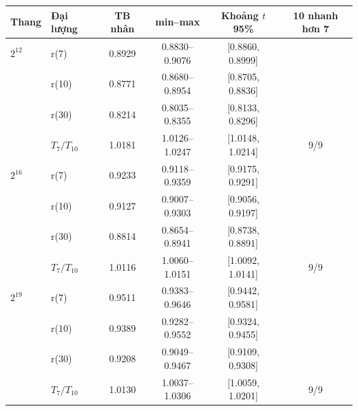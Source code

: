\begin{tabular}{llcccc}
\toprule
Thang & Đại lượng & TB nhân & min--max & Khoảng $t$ 95\% & 10 nhanh hơn 7 \\
\midrule
$2^{12}$ & r(7) & 0.8929 & 0.8830--0.9076 & [0.8860, 0.8999] &  \\
 & r(10) & 0.8771 & 0.8680--0.8954 & [0.8705, 0.8836] &  \\
 & r(30) & 0.8214 & 0.8035--0.8355 & [0.8133, 0.8296] &  \\
 & $T_7/T_{10}$ & 1.0181 & 1.0126--1.0247 & [1.0148, 1.0214] & 9/9 \\
\addlinespace
$2^{16}$ & r(7) & 0.9233 & 0.9118--0.9359 & [0.9175, 0.9291] &  \\
 & r(10) & 0.9127 & 0.9007--0.9303 & [0.9056, 0.9197] &  \\
 & r(30) & 0.8814 & 0.8654--0.8941 & [0.8738, 0.8891] &  \\
 & $T_7/T_{10}$ & 1.0116 & 1.0060--1.0151 & [1.0092, 1.0141] & 9/9 \\
\addlinespace
$2^{19}$ & r(7) & 0.9511 & 0.9383--0.9646 & [0.9442, 0.9581] &  \\
 & r(10) & 0.9389 & 0.9282--0.9552 & [0.9324, 0.9455] &  \\
 & r(30) & 0.9208 & 0.9049--0.9467 & [0.9109, 0.9308] &  \\
 & $T_7/T_{10}$ & 1.0130 & 1.0037--1.0306 & [1.0059, 1.0201] & 9/9 \\
\bottomrule
\end{tabular}
